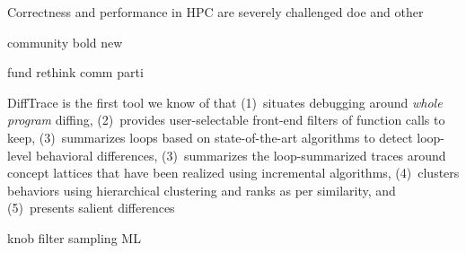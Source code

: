 



Correctness and performance in HPC are severely challenged 
doe and other

community
bold new

fund rethink comm parti

DiffTrace is the first tool we know of that (1)~situates debugging around {\em whole program}
diffing, (2)~provides user-selectable front-end filters of function calls to keep,
(3)~summarizes loops based on state-of-the-art algorithms to detect loop-level
behavioral differences,
(3)~summarizes the loop-summarized
traces around concept lattices that have been realized using incremental
algorithms, (4)~clusters behaviors using hierarchical clustering and ranks as per similarity,
and (5)~presents salient differences 

knob filter
sampling
ML
 
